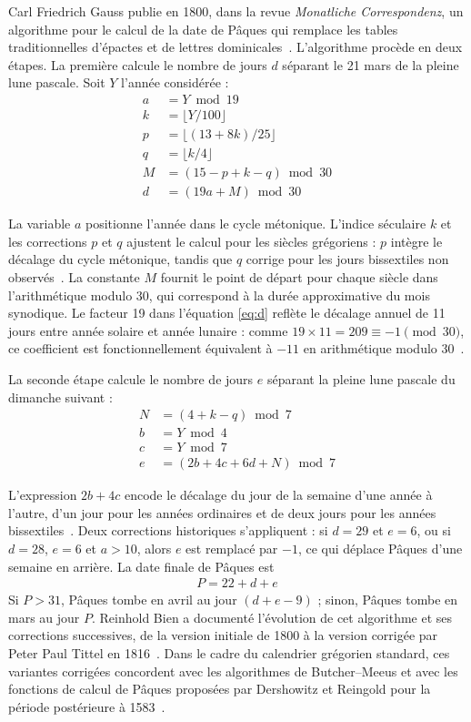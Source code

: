 \documentclass[final, fra]{anthology-ch}     %
\begin{document}
Carl Friedrich Gauss publie en 1800, dans la revue \textit{Monatliche Correspondenz}, un algorithme pour le calcul de la date de Pâques qui remplace les tables traditionnelles d'épactes et de lettres dominicales~\cite{gauss1800}. L'algorithme procède en deux étapes. La première calcule le nombre de jours $d$ séparant le 21 mars de la pleine lune pascale. Soit $Y$ l'année considérée :
\begin{align}
  a &= Y \bmod 19 \label{eq:a}\\
  k &= \lfloor Y / 100 \rfloor \label{eq:k}\\
  p &= \lfloor (13 + 8k) / 25 \rfloor \label{eq:p}\\
  q &= \lfloor k / 4 \rfloor \label{eq:q}\\
  M &= (15 - p + k - q) \bmod 30 \label{eq:M}\\
  d &= (19a + M) \bmod 30 \label{eq:d}
\end{align}

La variable $a$ positionne l'année dans le cycle métonique. L'indice séculaire $k$ et les corrections $p$ et $q$ ajustent le calcul pour les siècles grégoriens : $p$ intègre le décalage du cycle métonique, tandis que $q$ corrige pour les jours bissextiles non observés~\cite{bien2004}. La constante $M$ fournit le point de départ pour chaque siècle dans l'arithmétique modulo 30, qui correspond à la durée approximative du mois synodique. Le facteur 19 dans l'équation \eqref{eq:d} reflète le décalage annuel de 11 jours entre année solaire et année lunaire : comme $19 \times 11 = 209 \equiv -1 \pmod{30}$, ce coefficient est fonctionnellement équivalent à $-11$ en arithmétique modulo 30~\cite{bien2004}.

La seconde étape calcule le nombre de jours $e$ séparant la pleine lune pascale du dimanche suivant :
\begin{align}
  N &= (4 + k - q) \bmod 7 \label{eq:N}\\
  b &= Y \bmod 4 \label{eq:b}\\
  c &= Y \bmod 7 \label{eq:c}\\
  e &= (2b + 4c + 6d + N) \bmod 7 \label{eq:e}
\end{align}

L'expression $2b + 4c$ encode le décalage du jour de la semaine d'une année à l'autre, d'un jour pour les années ordinaires et de deux jours pour les années bissextiles~\cite{bien2004}. Deux corrections historiques s'appliquent : si $d = 29$ et $e = 6$, ou si $d = 28$, $e = 6$ et $a > 10$, alors $e$ est remplacé par $-1$, ce qui déplace Pâques d'une semaine en arrière. La date finale de Pâques est
\begin{align}
  P = 22 + d + e \label{eq:P}
\end{align}
Si $P > 31$, Pâques tombe en avril au jour $(d + e - 9)$ ; sinon, Pâques tombe en mars au jour $P$. Reinhold Bien a documenté l'évolution de cet algorithme et ses corrections successives, de la version initiale de 1800 à la version corrigée par Peter Paul Tittel en 1816~\cite{bien2004}. Dans le cadre du calendrier grégorien standard, ces variantes corrigées concordent avec les algorithmes de Butcher--Meeus et avec les fonctions de calcul de Pâques proposées par Dershowitz et Reingold pour la période postérieure à 1583~\cite{dershowitz2018}.
\end{document}
